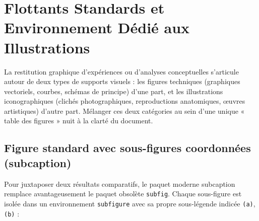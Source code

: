 \section{Flottants Standards et Environnement Dédié aux Illustrations}
\label{sec:figures_illustrations}

La restitution graphique d'expériences ou d'analyses conceptuelles s'articule autour de deux types de supports visuels :
les figures techniques (graphiques vectoriels, courbes, schémas de principe) d'une part, et les illustrations iconographiques (clichés photographiques, reproductions anatomiques, œuvres artistiques) d'autre part.
Mélanger ces deux catégories au sein d'une unique « table des figures » nuit à la clarté du document.

\subsection{Figure standard avec sous-figures coordonnées (\textsf{subcaption})}
\label{subsec:sous_figures}

Pour juxtaposer deux résultats comparatifs, le paquet moderne \textsf{subcaption} remplace avantageusement le paquet obsolète \texttt{subfig}.
Chaque sous-figure est isolée dans un environnement \texttt{subfigure} avec sa propre sous-légende indicée \texttt{(a)}, \texttt{(b)} :

